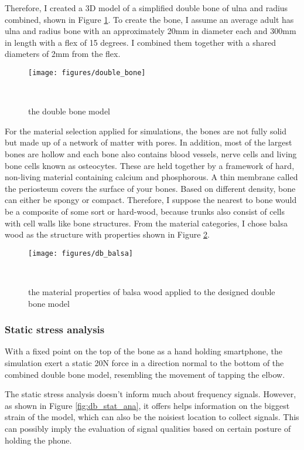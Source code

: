 \documentclass{sigchi}
\begin{document}
Therefore, I created a 3D model of a simplified double bone of ulna and radius combined, shown in Figure \ref{fig:double_bone}. To create the bone, I assume an average adult has ulna and radius bone with an approximately 20mm in diameter each and 300mm in length with a flex of 15 degrees. I combined them together with a shared diameters of 2mm from the flex. 


\begin{figure}
\centering
  \texttt{[image: figures/double\_bone]}
  \caption{the double bone model}~\label{fig:double_bone}
\end{figure}


For the material selection applied for simulations, the bones are not fully solid but made up of a network of matter with pores. In addition, most of the largest bones are hollow and each bone also contains blood vessels, nerve cells and living bone cells known as osteocytes. These are held together by a framework of hard, non-living material containing calcium and phosphorous. A thin membrane called the periosteum covers the surface of your bones. Based on different density, bone can either be spongy or compact. Therefore, I suppose the nearest to bone would be a composite of some sort or hard-wood, because trunks also consist of cells with cell walls like bone structures. From the material categories, I chose balsa wood as the structure with properties shown in Figure \ref{fig:db_balsa}.

\begin{figure}
\centering
  \texttt{[image: figures/db\_balsa]}
  \caption{the material properties of balsa wood applied to the designed double bone model}~\label{fig:db_balsa}
\end{figure}

\subsubsection{Static stress analysis}

With a fixed point on the top of the bone as a hand holding smartphone, the simulation exert a static 20N force in a direction normal to the bottom of the combined double bone model, resembling the movement of tapping the elbow.

The static stress analysis doesn't inform much about frequency signals. However, as shown in Figure \ref{fig:db_stat_ana}, it offers helps information on the biggest strain of the model, which can also be the noisiest location to collect signals. This can possibly imply the evaluation of signal qualities based on certain posture of holding the phone.
\end{document}

